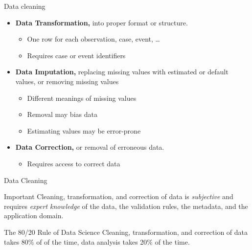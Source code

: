 \documentclass[ignorenonframetext,xcolor=x11names]{beamer}
\begin{document}
\begin{frame}{Data cleaning}
\begin{itemize}
	\item \textbf{Data Transformation,} into proper format or structure.
	\begin{itemize}
	  \item One row for each observation, case, event, \ldots
	  \item Requires case or event identifiers
	\end{itemize}
	\item \textbf{Data Imputation,} replacing missing values with estimated or default values, or removing missing values
	\begin{itemize}
	  \item Different meanings of missing values
	  \item Removal may bias data
	  \item Estimating values may be error-prone
	\end{itemize}
	\item \textbf{Data Correction,} or removal of erroneous data.
	\begin{itemize}
	  \item Requires access to correct data
	\end{itemize}
\end{itemize}
\end{frame}

\begin{frame}{Data Cleaning}
\begin{block}{Important}
Cleaning, transformation, and correction of data is \emph{subjective} and requires \emph{expert knowledge} of the data, the validation rules, the metadata, and the application domain.
\end{block}
\vspace{5mm}
\begin{block}{The 80/20 Rule of Data Science}
Cleaning, transformation, and correction of data takes 80\% of of the time, data analysis takes 20\% of the time.
\end{block}
\end{frame}
\end{document}
